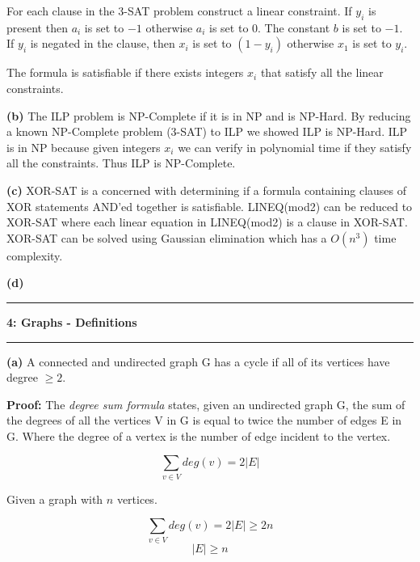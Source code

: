 \documentclass[11pt]{article}
\newcommand\question[2]{\vspace{.25in}\hrule\textbf{#1: #2}\vspace{.5em}\hrule\vspace{.10in}}
\renewcommand\part[1]{\vspace{.10in}\textbf{(#1)}}
\begin{document}
	For each clause in the 3-SAT problem construct a linear constraint. If $y_i$ is present then $a_i$ is set to $-1$ otherwise $a_i$ is set to $0$. The constant $b$ is set to $-1$. If $y_i$ is negated in the clause, then $x_i$ is set to $(1 - y_i)$ otherwise $x_1$ is set to $y_i$.
	
	The formula is satisfiable if there exists integers $x_i$ that satisfy all the linear constraints.
	
\part{b} The ILP problem is NP-Complete if it is in NP and is NP-Hard. By reducing a known NP-Complete problem (3-SAT) to ILP we showed ILP is NP-Hard. ILP is in NP because given integers $x_i$ we can verify in polynomial time if they satisfy all the constraints. Thus ILP is NP-Complete.

\part{c} XOR-SAT is a concerned with determining if a formula containing clauses of XOR statements AND'ed together is satisfiable. LINEQ(mod2) can be reduced to XOR-SAT where each linear equation in LINEQ(mod2) is a clause in XOR-SAT. XOR-SAT can be solved using Gaussian elimination which has a $O(n^3)$ time complexity.


\part{d}

\question{4}{Graphs - Definitions}

\part{a} A connected and undirected graph G has a cycle if all of its vertices have degree $\geq 2$.

\textbf{Proof:} The \textit{degree sum formula} states, given an undirected graph G, the sum of the degrees of all the vertices V in G is equal to twice the number of edges E in G. Where the degree of a vertex is the number of edge incident to the vertex.

$$\sum_{v \in V} deg(v) = 2|E|$$

Given a graph with $n$ vertices.

$$\sum_{v \in V} deg(v) = 2|E| \geq 2n$$
$$|E| \geq n$$
\end{document}
